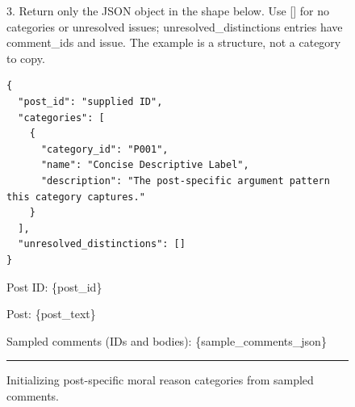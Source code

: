 \begin{figure}[H]
\begin{minipage}{0.97\textwidth}
3. Return only the JSON object in the shape below. Use [] for no categories or unresolved issues; unresolved\_distinctions entries have comment\_ids and issue. The example is a structure, not a category to copy.

\begin{verbatim}
{
  "post_id": "supplied ID",
  "categories": [
    {
      "category_id": "P001",
      "name": "Concise Descriptive Label",
      "description": "The post-specific argument pattern this category captures."
    }
  ],
  "unresolved_distinctions": []
}
\end{verbatim}

Post ID: \{post\_id\}

Post: \{post\_text\}

Sampled comments (IDs and bodies): \{sample\_comments\_json\}

\vspace{0.6em}
\hrule
\end{minipage}
\caption{Initializing post-specific moral reason categories from sampled comments.}
\label{fig:moral-reason-initialize-prompt}
\end{figure}
